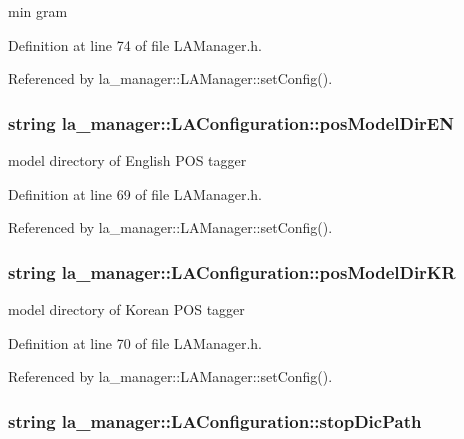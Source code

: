 min gram 



Definition at line 74 of file LAManager.h.

Referenced by la\_\-manager::LAManager::setConfig().\hypertarget{classla__manager_1_1LAConfiguration_4fa8698f13d1fe2c9b946b12093e904a}{
\subsubsection[{posModelDirEN}]{\setlength{\rightskip}{0pt plus 5cm}string {\bf la\_\-manager::LAConfiguration::posModelDirEN}}}
\label{classla__manager_1_1LAConfiguration_4fa8698f13d1fe2c9b946b12093e904a}


model directory of English POS tagger 



Definition at line 69 of file LAManager.h.

Referenced by la\_\-manager::LAManager::setConfig().\hypertarget{classla__manager_1_1LAConfiguration_b25c9b6b37231ef0cdf95bf482275a05}{
\subsubsection[{posModelDirKR}]{\setlength{\rightskip}{0pt plus 5cm}string {\bf la\_\-manager::LAConfiguration::posModelDirKR}}}
\label{classla__manager_1_1LAConfiguration_b25c9b6b37231ef0cdf95bf482275a05}


model directory of Korean POS tagger 



Definition at line 70 of file LAManager.h.

Referenced by la\_\-manager::LAManager::setConfig().\hypertarget{classla__manager_1_1LAConfiguration_742018fadbd178f65c971474765fc1e4}{
\subsubsection[{stopDicPath}]{\setlength{\rightskip}{0pt plus 5cm}string {\bf la\_\-manager::LAConfiguration::stopDicPath}}}
\label{classla__manager_1_1LAConfiguration_742018fadbd178f65c971474765fc1e4}


